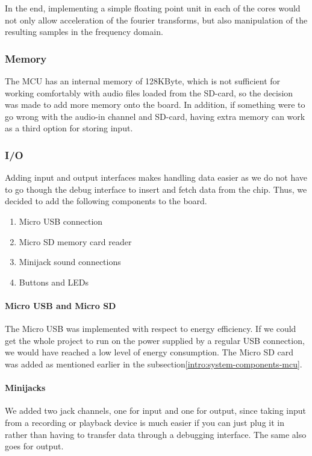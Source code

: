 In the end, implementing a simple floating point unit in each of the cores
would not only allow acceleration of the fourier transforms, but also
manipulation of the resulting samples in the frequency domain.

\subsubsection{Memory}

The MCU has an internal memory of 128KByte, which is not sufficient for working
comfortably with audio files loaded from the SD-card, so the decision was made
to add more memory onto the board. In addition, if something were to go wrong
with the audio-in channel and SD-card, having extra memory can work as a third
option for storing input.

\subsubsection{I/O}

Adding input and output interfaces makes handling data easier as we do not have
to go though the debug interface to insert and fetch data from the chip. Thus,
we decided to add the following components to the board.

\begin{enumerate}
	\item Micro USB connection
	\item Micro SD memory card reader
	\item Minijack sound connections
	\item Buttons and LEDs
\end{enumerate}

\paragraph{Micro USB and Micro SD}

The Micro USB was implemented with respect to energy efficiency. If we could get
the whole project to run on the power supplied by a regular USB connection, we
would have reached a low level of energy consumption. The Micro SD card was
added as mentioned earlier in the subsection\ref{intro:system-components-mcu}.

\paragraph{Minijacks}

We added two jack channels, one for input and one for output, since taking input
from a recording or playback device is much easier if you can just plug it in
rather than having to transfer data through a debugging interface. The same also
goes for output.

